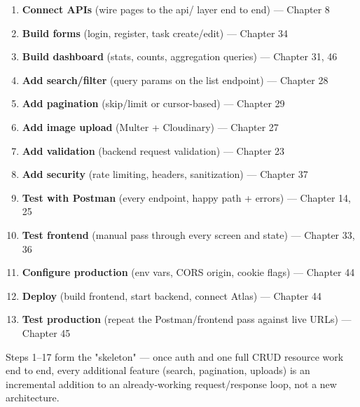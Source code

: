 \begin{enumerate}
\item \textbf{Connect APIs} (wire pages to the api/ layer end to end) --- Chapter 8
\item \textbf{Build forms} (login, register, task create/edit) --- Chapter 34
\item \textbf{Build dashboard} (stats, counts, aggregation queries) --- Chapter 31, 46
\item \textbf{Add search/filter} (query params on the list endpoint) --- Chapter 28
\item \textbf{Add pagination} (skip/limit or cursor-based) --- Chapter 29
\item \textbf{Add image upload} (Multer + Cloudinary) --- Chapter 27
\item \textbf{Add validation} (backend request validation) --- Chapter 23
\item \textbf{Add security} (rate limiting, headers, sanitization) --- Chapter 37
\item \textbf{Test with Postman} (every endpoint, happy path + errors) --- Chapter 14, 25
\item \textbf{Test frontend} (manual pass through every screen and state) --- Chapter 33, 36
\item \textbf{Configure production} (env vars, CORS origin, cookie flags) --- Chapter 44
\item \textbf{Deploy} (build frontend, start backend, connect Atlas) --- Chapter 44
\item \textbf{Test production} (repeat the Postman/frontend pass against live URLs) --- Chapter 45
\end{enumerate}

\begin{tipbox}[TIP]
Steps 1--17 form the "skeleton" --- once auth and one full CRUD resource
work end to end, every additional feature (search, pagination, uploads)
is an incremental addition to an already-working request/response loop,
not a new architecture.
\end{tipbox}
